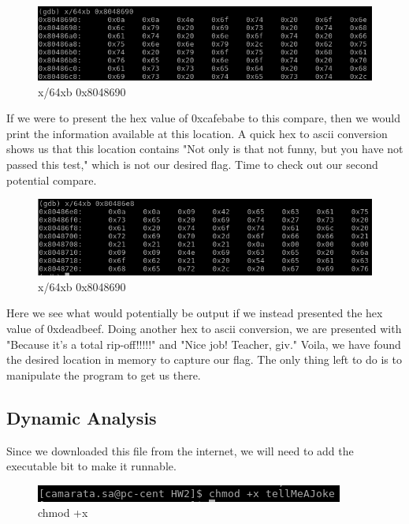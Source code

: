 \documentclass[10pt]{article}
\begin{document}
\begin{figure}[H]
\centering
\includegraphics[scale=0.5]{./images/ss8.png}
\caption{x/64xb 0x8048690}
\label{fig:Code}
\end{figure}

If we were to present the hex value of 0xcafebabe to this compare, then we would print the information available at this location.  A quick hex to ascii conversion shows us that this location contains "Not only is that not funny, but you have not passed this test," which is not our desired flag.  Time to check out our second potential compare.

\begin{figure}[H]
\centering
\includegraphics[scale=0.5]{./images/ss9.png}
\caption{x/64xb 0x8048690}
\label{fig:Code}
\end{figure}

Here we see what would potentially be output if we instead presented the hex value of 0xdeadbeef.  Doing another hex to ascii conversion, we are presented with "Because it's a total rip-off!!!!!" and "Nice job! Teacher, giv." Voila, we have found the desired location in memory to capture our flag.  The only thing left to do is to manipulate the program to get us there.

\subsection{Dynamic Analysis}
Since we downloaded this file from the internet, we will need to add the executable bit to make it runnable.

\begin{figure}[H]
\centering
\includegraphics[scale=0.5]{./images/ss2.png}
\caption{chmod +x}
\label{fig:Code}
\end{figure}
\end{document}
